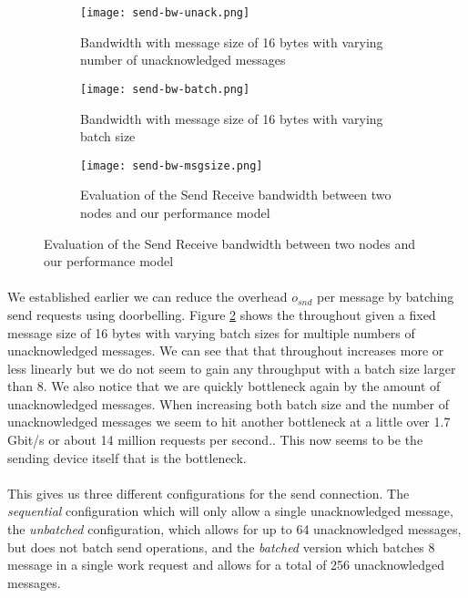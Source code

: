 \begin{figure}[]
\begin{subfigure}[b]{0.49\textwidth}
  \centering
  \texttt{[image: send-bw-unack.png]}
  \caption{Bandwidth with message size of 16 bytes with varying number of unacknowledged messages}
  \label{fig:plot-sndrcv-bw-unack}
\end{subfigure}
\begin{subfigure}[b]{0.49\textwidth}
  \centering
  \texttt{[image: send-bw-batch.png]}
  \caption{Bandwidth with message size of 16 bytes with varying batch size}
  \label{fig:plot-sndrcv-bw-batch}
\end{subfigure}
\begin{subfigure}[b]{1\textwidth}
  \centering
  \texttt{[image: send-bw-msgsize.png]}
  \caption{Evaluation of the Send Receive bandwidth between two nodes and our performance model}
  \label{fig:plot-sndrcv-bw}
\end{subfigure}
\end{figure}


\paragraph{} We established earlier we can reduce the overhead $o_{snd}$ per message by batching send requests using
doorbelling. Figure \ref{fig:plot-sndrcv-bw-batch} shows the throughout given a fixed message size of 16 bytes with 
varying batch sizes for multiple numbers of unacknowledged messages. We can see that that throughout increases more or
less linearly but we do not seem to gain any throughput with a batch size larger than 8. We also notice that we are
quickly bottleneck again by the amount of unacknowledged messages. When increasing both batch size and the number of
unacknowledged messages we seem to hit another bottleneck at a little over 1.7 Gbit/s or about 14 million requests 
per second.. This now seems to be the sending device itself that 
is the bottleneck.



\paragraph{} This gives us three different configurations for the send connection. The \emph{sequential} configuration
which will only allow a single unacknowledged message, the \emph{unbatched} configuration, which allows for up to 64
unacknowledged messages, but does not batch send operations, and the \emph{batched} version which batches 8 message
in a single work request and allows for a total of 256 unacknowledged messages.

